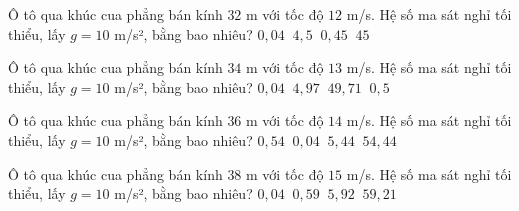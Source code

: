\begin{ex}
Ô tô qua khúc cua phẳng bán kính $32$ m với tốc độ $12$ m/s. Hệ số ma sát nghỉ tối thiểu, lấy $g=10$ m/s², bằng bao nhiêu?
\choice
{$0,04\ \mathrm{}$}
{$4,5\ \mathrm{}$}
{\True $0,45\ \mathrm{}$}
{$45\ \mathrm{}$}
\end{ex}

\begin{ex}
Ô tô qua khúc cua phẳng bán kính $34$ m với tốc độ $13$ m/s. Hệ số ma sát nghỉ tối thiểu, lấy $g=10$ m/s², bằng bao nhiêu?
\choice
{$0,04\ \mathrm{}$}
{$4,97\ \mathrm{}$}
{$49,71\ \mathrm{}$}
{\True $0,5\ \mathrm{}$}
\end{ex}

\begin{ex}
Ô tô qua khúc cua phẳng bán kính $36$ m với tốc độ $14$ m/s. Hệ số ma sát nghỉ tối thiểu, lấy $g=10$ m/s², bằng bao nhiêu?
\choice
{\True $0,54\ \mathrm{}$}
{$0,04\ \mathrm{}$}
{$5,44\ \mathrm{}$}
{$54,44\ \mathrm{}$}
\end{ex}

\begin{ex}
Ô tô qua khúc cua phẳng bán kính $38$ m với tốc độ $15$ m/s. Hệ số ma sát nghỉ tối thiểu, lấy $g=10$ m/s², bằng bao nhiêu?
\choice
{$0,04\ \mathrm{}$}
{\True $0,59\ \mathrm{}$}
{$5,92\ \mathrm{}$}
{$59,21\ \mathrm{}$}
\end{ex}

